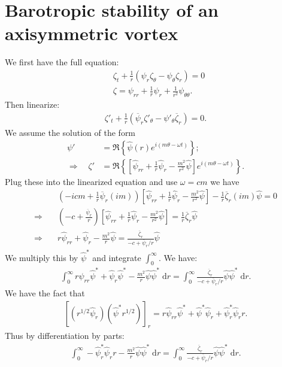 \documentclass[11pt,letterpaper]{book}
\theoremstyle{definition}
\newcommand{\de}{\mathrm{d}}
\newcommand{\dsp}{\displaystyle}
\newcommand{\thus}{\Rightarrow \quad }
\begin{document}
\section{Barotropic stability of an axisymmetric vortex}
We first have the full equation:
\begin{align*}
&\zeta_t + \frac{1}{r}(\psi_r\zeta_\theta-\psi_\theta\zeta_r) = 0\\
&\zeta = \psi_{rr}+\frac{1}{r}\psi_r+\frac{1}{r^2}\psi_{\theta\theta}.
\end{align*}
Then linearize:
\begin{align*}
\zeta'_t + \frac{1}{r}(\overline \psi_r\zeta'_\theta-\psi'_\theta\overline\zeta_r) = 0.
\end{align*}
We assume the solution of the form
\begin{align*}
\psi' &= \Re\left\{ \hat{\psi}(r)e^{i(m\theta-\omega t)} \right\};\\
\thus \zeta' &= \Re\left\{ \left[ \hat{\psi}_{rr}+\frac{1}{r}\hat{\psi}_r-\frac{m^2}{r^2}\hat{\psi} \right] e^{i(m\theta-\omega t)} \right\}.
\end{align*}
Plug these into the linearized equation and use $\omega = cm$ we have
\begin{align*}
&\left(-icm+\frac{1}{r}\overline{\psi}_r(im)  \right)\left[ \hat{\psi}_{rr}+\frac{1}{r}\hat{\psi}_r-\frac{m^2}{r^2}\hat{\psi} \right]-\frac{1}{r}\overline{\zeta}_r(im)\hat{\psi} = 0\\
\thus& \left(-c+\frac{\overline{\psi}_r}{r} \right)\left[ \hat{\psi}_{rr}+\frac{1}{r}\hat{\psi}_r-\frac{m^2}{r^2}\hat{\psi} \right] = \frac{1}{r}\overline{\zeta}_r\hat{\psi}\\
\thus&  r\hat{\psi}_{rr}+\hat{\psi}_r-\frac{m^2}{r}\hat{\psi} = \frac{\overline{\zeta}_r}{-c+{\overline{\psi}_r}/r}\hat{\psi}
\end{align*}
We multiply this by $\hat{\psi}^*$ and integrate $\dsp{\int^\infty_0}$. We have:
\begin{align*}
\int^\infty_0r\hat{\psi}_{rr}\hat{\psi}^*+\hat{\psi}_r\hat{\psi}^*-\frac{m^2}{r}\hat{\psi}\hat{\psi}^*\;\de r = \int^\infty_0\frac{\overline{\zeta}_r}{-c+{\overline{\psi}_r}/r}\hat{\psi}\hat{\psi}^*\;\de r.
\end{align*}
We have the fact that
\begin{align*}
\left[\left(r^{1/2}\hat\psi_r\right)\left(\hat\psi^*r^{1/2}\right)\right]_r = r\hat\psi_{rr}\hat\psi^*+\hat\psi^*\hat\psi_r+\hat\psi^*_r\hat\psi_rr.
\end{align*}
Thus by differentiation by parts:
\begin{align*}
\int^\infty_0-\hat\psi^*_r\hat\psi_rr-\frac{m^2}{r}\hat{\psi}\hat{\psi}^*\;\de r = \int^\infty_0\frac{\overline{\zeta}_r}{-c+{\overline{\psi}_r}/r}\hat{\psi}\hat{\psi}^*\;\de r.
\end{align*}
\end{document}
